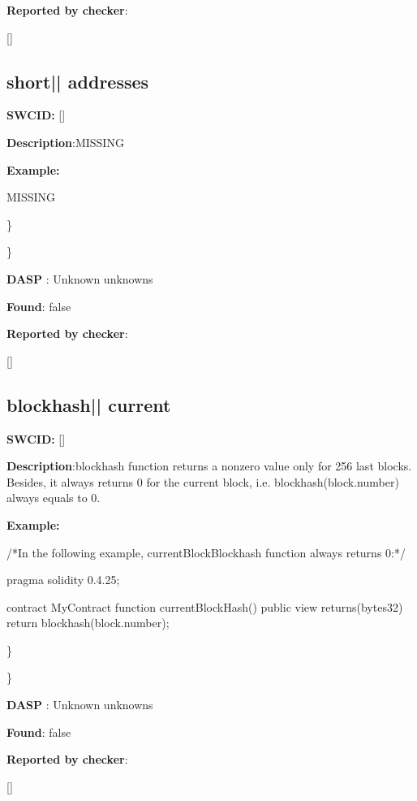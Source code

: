 \documentclass{article}
\begin{document}
\textbf{Reported by checker}: 
\begin{ffcode} 

[]
\end{ffcode} 
\subsection{short{|\textunderscore| }addresses} 
\textbf{SWC{\textunderscore }ID:} []

\textbf{Description}:MISSING


\textbf{Example:} 
\begin{ffcode} 

MISSING

\end{ffcode} 
\} 

\} 

\textbf{DASP} : Unknown unknowns

\textbf{Found}: false

\textbf{Reported by checker}: 
\begin{ffcode} 

[]
\end{ffcode} 
\subsection{blockhash{|\textunderscore| }current} 
\textbf{SWC{\textunderscore }ID:} []

\textbf{Description}:blockhash function returns a non{\textendash}zero value only for 256 last blocks. Besides, it always returns 0 for the current block, i.e. blockhash(block.number) always equals to 0.


\textbf{Example:} 
\begin{ffcode} 

/*In the following example, currentBlockBlockhash function always returns 0:*/ 

pragma solidity 0.4.25;

contract MyContract {
    function currentBlockHash() public view returns(bytes32) {
        return blockhash(block.number);
    }
}

\end{ffcode} 
\} 

\} 

\textbf{DASP} : Unknown unknowns

\textbf{Found}: false

\textbf{Reported by checker}: 
\begin{ffcode} 

[]
\end{ffcode} 
\end{document}
